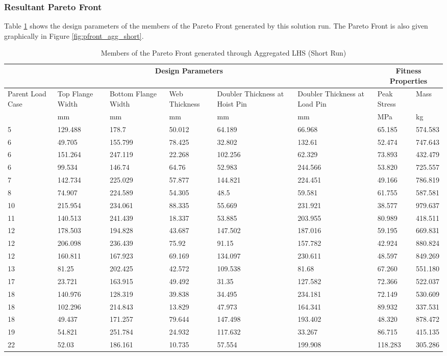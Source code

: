 \subsubsection{Resultant Pareto Front}
Table \ref{tab:pfront_agg_short} shows the design parameters of the members of the Pareto Front generated by this solution run. The Pareto Front is also given graphically in Figure \ref{fig:pfront_agg_short}. 
\begin{table}[!htbp]
\small
\begin{tabular}{|p{1.5cm}p{1.5cm}p{1.5cm}p{1.4cm}p{2cm}p{2cm}||p{1.5cm}p{1.5cm}|}
\hline
\multicolumn{6}{|c||}{Design Parameters}&\multicolumn{2}{|c|}{Fitness Properties}\\
\hline
Parent Load Case&Top Flange Width&Bottom Flange Width&Web Thickness&Doubler Thickness at Hoist Pin&Doubler Thickness at Load Pin&Peak Stress& Mass\\
\hline
&mm&mm&mm&mm&mm&MPa&kg\\
\hline
5&129.488&178.7&50.012&64.189&66.968&65.185&574.583\\
6&49.705&155.799&78.425&32.802&132.61&52.474&747.643\\
6&151.264&247.119&22.268&102.256&62.329&73.893&432.479\\
6&99.534&146.74&64.76&52.983&244.566&53.820&725.557\\
7&142.734&225.029&57.877&144.821&224.451&49.166&786.819\\
8&74.907&224.589&54.305&48.5&59.581&61.755&587.581\\
10&215.954&234.061&88.335&55.669&231.921&38.577&979.637\\
11&140.513&241.439&18.337&53.885&203.955&80.989&418.511\\
12&178.503&194.828&43.687&147.502&187.016&59.195&669.831\\
12&206.098&236.439&75.92&91.15&157.782&42.924&880.824\\
12&160.811&167.923&69.169&134.097&230.611&48.597&849.269\\
13&81.25&202.425&42.572&109.538&81.68&67.260&551.180\\
17&23.721&163.915&49.492&31.35&127.582&72.366&522.037\\
18&140.976&128.319&39.838&34.495&234.181&72.149&530.609\\
18&102.296&214.843&13.829&47.973&164.341&89.932&337.531\\
18&49.437&171.257&79.644&147.498&193.402&48.320&878.472\\
19&54.821&251.784&24.932&117.632&33.267&86.715&415.135\\
22&52.03&186.161&10.735&57.554&199.908&118.283&305.286\\
\hline
\end{tabular}
\caption{Members of the Pareto Front generated through Aggregated LHS (Short Run)}
\label{tab:pfront_agg_short}
\end{table}

